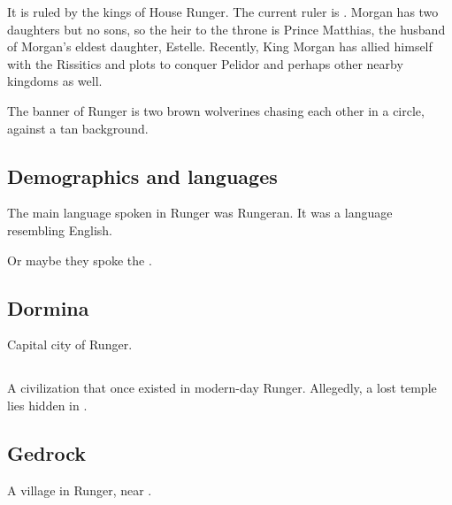 
It is ruled by the kings of House Runger. 
The current ruler is . 
Morgan has two daughters but no sons, so the heir to the throne is Prince Matthias, the husband of Morgan's eldest daughter, Estelle. Recently, King Morgan has allied himself with the Rissitics and plots to conquer Pelidor and perhaps other nearby kingdoms as well. 

The banner of Runger is two brown wolverines chasing each other in a circle, against a tan background.









\subsection{Demographics and languages}
The main language spoken in Runger was Rungeran. 
It was a \human language resembling English. 

Or maybe they spoke the .









\subsection{Dormina}
Capital city of Runger. 









\subsection{\EreshKal}
\index{\EreshKal}
A \meccaran{} civilization that once existed in modern-day Runger. Allegedly, a lost \EreshKali{} temple lies hidden in .  









\subsection{Gedrock}
A village in Runger, near . 










